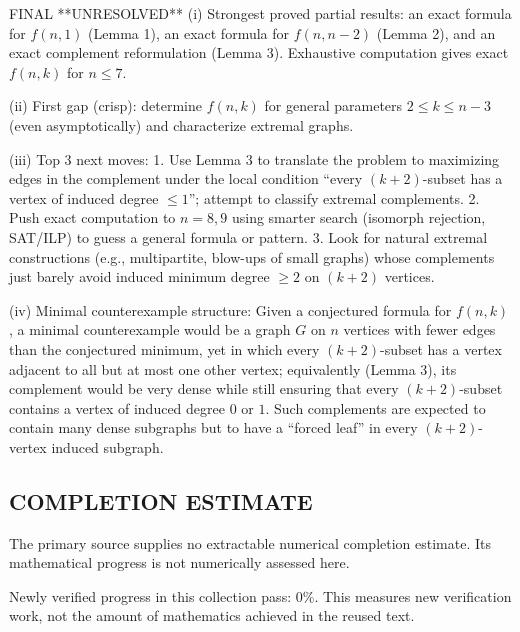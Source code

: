 FINAL
**UNRESOLVED**
(i) Strongest proved partial results: an exact formula for $f(n,1)$ (Lemma 1),
an exact formula for $f(n,n-2)$ (Lemma 2), and an exact complement reformulation
(Lemma 3). Exhaustive computation gives exact $f(n,k)$ for $n\le7$.

(ii) First gap (crisp): determine $f(n,k)$ for general parameters
$2\le k\le n-3$ (even asymptotically) and characterize extremal graphs.

(iii) Top 3 next moves:
1. Use Lemma 3 to translate the problem to maximizing edges in the complement
under the local condition ``every $(k+2)$-subset has a vertex of induced degree
$\le1$''; attempt to classify extremal complements.
2. Push exact computation to $n=8,9$ using smarter search (isomorph rejection,
SAT/ILP) to guess a general formula or pattern.
3. Look for natural extremal constructions (e.g., multipartite, blow-ups of
small graphs) whose complements just barely avoid induced minimum degree $\ge2$
on $(k+2)$ vertices.

(iv) Minimal counterexample structure:
Given a conjectured formula for $f(n,k)$, a minimal counterexample would be a
graph $G$ on $n$ vertices with fewer edges than the conjectured minimum, yet in
which every $(k+2)$-subset has a vertex adjacent to all but at most one other
vertex; equivalently (Lemma 3), its complement would be very dense while still
ensuring that every $(k+2)$-subset contains a vertex of induced degree $0$ or $1$.
Such complements are expected to contain many dense subgraphs but to have a
``forced leaf'' in every $(k+2)$-vertex induced subgraph.



\subsection*{COMPLETION ESTIMATE}
The primary source supplies no extractable numerical completion estimate. Its mathematical progress is not numerically assessed here.

Newly verified progress in this collection pass: $0\%$. This measures new verification work, not the amount of mathematics achieved in the reused text.
